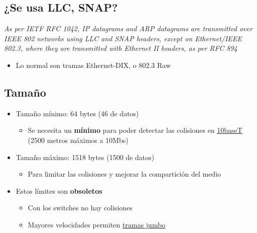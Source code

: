 \documentclass{article}
\begin{document}
\subsection{¿Se usa LLC, SNAP?}
\label{sec:org0d7bf1b}
\emph{As per IETF RFC 1042, IP datagrams and ARP datagrams are transmitted over IEEE 802 networks using LLC and SNAP headers, except on Ethernet/IEEE 802.3, where they are transmitted with Ethernet II headers, as per RFC 894}
\begin{itemize}
\item Lo normal son tramas Ethernet-DIX, o 802.3 Raw
\end{itemize}


\subsection{Tamaño}
\label{sec:org5f45bd7}
\begin{itemize}
\item Tamaño mínimo: 64 bytes (46 de datos)
\begin{itemize}
\item Se necesita un \textbf{mínimo} para poder detectar las colisiones en \href{https://es.wikipedia.org/wiki/10BASE-T}{10baseT} (2500 metros máximos a 10Mbs)
\end{itemize}
\item Tamaño máximo: 1518 bytes (1500 de datos)
\begin{itemize}
\item Para limitar las colisiones y mejorar la compartición del medio
\end{itemize}
\item Estos límites son \textbf{obsoletos}
\begin{itemize}
\item Con los switches no hay colisiones
\item Mayores velocidades permiten \href{https://en.wikipedia.org/wiki/Jumbo\_frame}{tramas jumbo}
\end{itemize}
\end{itemize}
\end{document}
